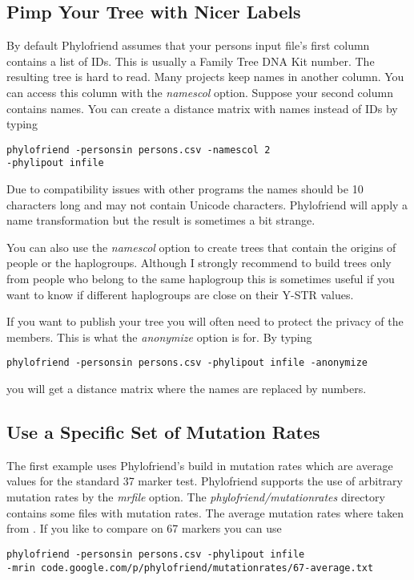 \subsection{Pimp Your Tree with Nicer Labels}

By default Phylofriend assumes that your persons input file's
first column contains a list of IDs. This is usually a Family
Tree DNA Kit number. The resulting tree is hard to read. Many
projects keep names in another column. You can access this 
column with the \emph{namescol} option. Suppose your second
column contains names. You can create a distance matrix with
names instead of IDs by typing

\noindent\texttt{phylofriend -personsin persons.csv -namescol 2\\
-phylipout infile}

Due to compatibility issues with other programs the names
should be 10 characters long and may not contain Unicode
characters. Phylofriend will apply a name transformation
but the result is sometimes a bit strange.

You can also use the \emph{namescol} option to create trees
that contain the origins of people or the haplogroups. Although
I strongly recommend to build trees only from people who
belong to the same haplogroup this is sometimes useful if
you want to know if different haplogroups are close on their
Y-STR values.

If you want to publish your tree you will often need to
protect the privacy of the members. This is what the
\emph{anonymize} option is for. By typing

\noindent\texttt{phylofriend -personsin persons.csv -phylipout infile -anonymize}

you will get a distance matrix where the names are replaced
by numbers.


\subsection{Use a Specific Set of Mutation Rates}

The first example uses Phylofriend's build in mutation rates
which are average values for the standard 37 marker test.
Phylofriend supports the use of arbitrary mutation rates by
the \emph{mrfile} option. The \emph{phylofriend/mutationrates}
directory contains some files with mutation rates. The average
mutation rates where taken from \cite{Kly12}.
If you like to compare on 67 markers you can use

\noindent\texttt{phylofriend -personsin persons.csv -phylipout infile\\
-mrin code.google.com/p/phylofriend/mutationrates/67-average.txt}


